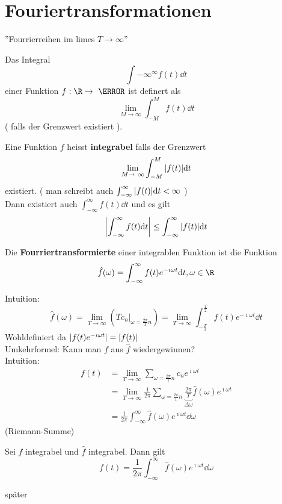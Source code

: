 \chapter{Fouriertransformationen}
''Fourrierreihen im limes $T \rightarrow \infty$''

\begin{def*}[note = Integral , index = Integral]
	Das Integral
	\[ \int{-\infty}^{\infty} f(t) \dd t \]
	einer Funktion $f: \R \rightarrow \C$ ist definert als
	\[ \lim_{M \rightarrow \infty} \int_{-M}^M f(t) \dd t \]
	( falls der Grenzwert existiert ).
\end{def*}
\begin{def*}[note = integrabel , index = integrabel]
	Eine Funktion $f$ heisst \textbf{integrabel} falls der Grenzwert
	\[ \lim_{M \rightarrow \infty} \int_{-M}^M \abs{f(t)} \dd t \]
	existiert. ( man schreibt auch $\int_{-\infty}^\infty \abs{f(t)} \dd t < \infty$ ) \\
	Dann existiert auch $\int_{-\infty}^\infty f(t) \dd t$ und es gilt
	\[ \abs{\int_{-\infty}^\infty f(t) \dd t} \leq \int_{-\infty}^\infty \abs{f(t)} \dd t \]
\end{def*}
\begin{def*}[note = Fourriertransformierte , index = Fourrier transformierte , indexformat = {1!~.2 2!1.~}]
	Die \textbf{Fourriertransformierte} einer integrablen Funktion ist die Funktion
	\[ \hat{f}(\omega) = \int_{-\infty}^\infty f(t) e^{-\imath\omega t} \dd t , \omega \in \R \]
\end{def*}
Intuition:
\[ \hat{f}(\omega) = \lim_{T \rightarrow \infty} ( T c_n |_{\omega = \frac{2\pi}{T} n} ) = \lim_{T \rightarrow \infty} \int_{-\frac{T}{2}}^{\frac{T}{2}} f(t) e^{-\imath\omega t} \dd t \]
Wohldefiniert da $\abs{f(t) e^{-\imath\omega t}} = \abs{f(t)}$ \\
Umkehrformel: Kann man $f$ aus $\hat{f}$ wiedergewinnen? \\
Intuition:
\[ \begin{split}
	f(t)	&= \lim_{T \rightarrow \infty} \sum_{\omega = \frac{2\pi}{t} n} c_n e^{\imath \omega t} \\
		&= \lim_{T \rightarrow \infty} \frac{1}{2\pi} \sum_{\omega = \frac{2\pi}{t} n} \underbrace{\frac{2\pi}{T}}_{\Delta \omega} \hat{f}(\omega) e^{\imath\omega t} \\
		&= \frac{1}{2\pi} \int_{-\infty}^\infty \hat{f}(\omega) e^{\imath\omega t} \dd \omega
\end{split} \]
(Riemann-Summe) \\
\begin{satz*}[note = Umkehrsatz von Fourier]
	Sei $f$ integrabel und $\hat{f}$ integrabel. Dann gilt
	\[ f(t) = \frac{1}{2\pi} \int_{-\infty}^\infty \hat{f}(\omega) e^{\imath\omega t} \dd \omega \]
	\begin{bew}
		später
	\end{bew}
\end{satz*}
